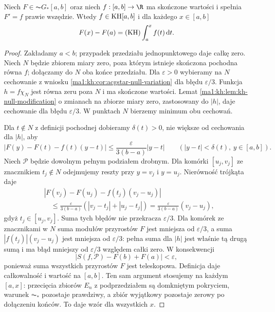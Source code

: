 \begin{twierdzenie}
\label{ma1:kh:thm:acgstar-derivative-integrable}\label{it:thm:acgstar-derivative-integrable}
Niech $F\in\AC G_*[a,b]$ oraz niech $f:[a,b]\to\R$ ma skończone wartości i spełnia $F'=f$ prawie wszędzie. Wtedy $f\in\mathrm{KH}[a,b]$ i dla każdego $x\in[a,b]$
\[
 F(x)-F(a)=(\mathrm{KH})\int_a^x f(t)\,\mathrm dt.
\]
\end{twierdzenie}
\begin{proof}
Zakładamy $a<b$; przypadek przedziału jednopunktowego daje całkę zero. Niech $N$ będzie zbiorem miary zero, poza którym istnieje skończona pochodna równa $f$; dołączamy do $N$ oba końce przedziału. Dla $\varepsilon>0$ wybieramy na $N$ cechowanie z wniosku \ref{ma1:kh:cor:acgstar-null-variation} dla błędu $\varepsilon/3$. Funkcja $h=f\chi_N$ jest równa zeru poza $N$ i ma skończone wartości. Lemat \ref{ma1:kh:lem:kh-null-modification} o zmianach na zbiorze miary zero, zastosowany do $|h|$, daje cechowanie dla błędu $\varepsilon/3$. W punktach $N$ bierzemy minimum obu cechowań.

Dla $t\notin N$ z definicji pochodnej dobieramy $\delta(t)>0$, nie większe od cechowania dla $|h|$, aby
\[
 |F(y)-F(t)-f(t)(y-t)|\le
 \frac{\varepsilon}{3(b-a)}|y-t|
 \qquad (|y-t|<\delta(t),\ y\in[a,b]).
\]
Niech $\mathcal P$ będzie dowolnym pełnym podziałem drobnym. Dla komórki $[u_j,v_j]$ ze znacznikiem $t_j\notin N$
odejmujemy reszty przy $y=v_j$ i $y=u_j$. Nierówność
trójkąta daje
\[
\begin{aligned}
 &|F(v_j)-F(u_j)-f(t_j)(v_j-u_j)|\\
 &\quad\le\frac{\varepsilon}{3(b-a)}
       (|v_j-t_j|+|u_j-t_j|)
 =\frac{\varepsilon}{3(b-a)}(v_j-u_j),
\end{aligned}
\]
gdyż $t_j\in[u_j,v_j]$. Suma tych błędów nie przekracza $\varepsilon/3$. Dla komórek ze znacznikami w $N$ suma modułów przyrostów $F$ jest mniejsza od $\varepsilon/3$, a suma $|f(t_j)|(v_j-u_j)$ jest mniejsza od $\varepsilon/3$: pełna suma dla $|h|$ jest właśnie tą drugą sumą i ma błąd mniejszy od $\varepsilon/3$ względem całki zero. W konsekwencji
\[
 |S(f,\mathcal P)-F(b)+F(a)|<\varepsilon,
\]
ponieważ suma wszystkich przyrostów $F$ jest teleskopowa. Definicja daje całkowalność i wartość na $[a,b]$. Ten sam argument stosujemy na każdym $[a,x]$: przecięcia zbiorów $E_n$ z podprzedziałem są domkniętym pokryciem, warunek $\AC_*$ pozostaje prawdziwy, a zbiór wyjątkowy pozostaje zerowy po dołączeniu końców. To daje wzór dla wszystkich $x$.
\end{proof}

